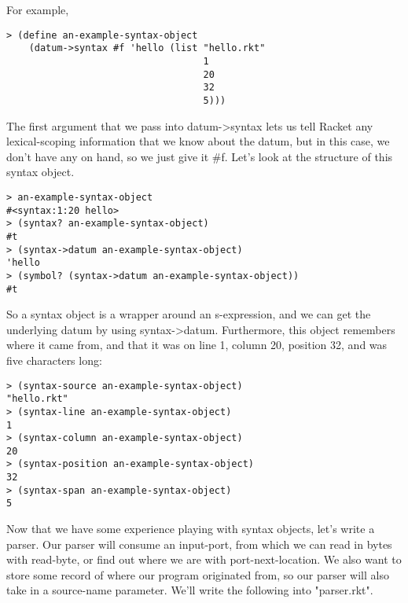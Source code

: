 \documentclass{article}
\begin{document}
For example,
\begin{verbatim}
> (define an-example-syntax-object
    (datum->syntax #f 'hello (list "hello.rkt"
                                   1
                                   20
                                   32
                                   5)))
\end{verbatim}
The first argument that we pass into datum->syntax lets us tell Racket any lexical-scoping information that we know about the datum, but in this case, we don’t have any on hand, so we just give it #f. Let’s look at the structure of this syntax object.
\begin{verbatim}
> an-example-syntax-object
#<syntax:1:20 hello>
> (syntax? an-example-syntax-object)
#t
> (syntax->datum an-example-syntax-object)
'hello
> (symbol? (syntax->datum an-example-syntax-object))
#t
\end{verbatim}
So a syntax object is a wrapper around an s-expression, and we can get the underlying datum by using syntax->datum. Furthermore, this object remembers where it came from, and that it was on line 1, column 20, position 32, and was five characters long:
\begin{verbatim}
> (syntax-source an-example-syntax-object)
"hello.rkt"
> (syntax-line an-example-syntax-object)
1
> (syntax-column an-example-syntax-object)
20
> (syntax-position an-example-syntax-object)
32
> (syntax-span an-example-syntax-object)
5
\end{verbatim}
Now that we have some experience playing with syntax objects, let’s write a parser. Our parser will consume an input-port, from which we can read in bytes with read-byte, or find out where we are with port-next-location. We also want to store some record of where our program originated from, so our parser will also take in a source-name parameter. We’ll write the following into "parser.rkt".
\end{document}
